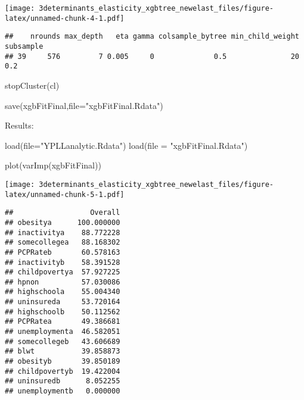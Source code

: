 \documentclass[
]{article}
\newenvironment{Shaded}{\begin{snugshade}}{\end{snugshade}}
\newcommand{\AttributeTok}[1]{\textcolor[rgb]{0.77,0.63,0.00}{#1}}
\newcommand{\FunctionTok}[1]{\textcolor[rgb]{0.00,0.00,0.00}{#1}}
\newcommand{\NormalTok}[1]{#1}
\newcommand{\OtherTok}[1]{\textcolor[rgb]{0.56,0.35,0.01}{#1}}
\newcommand{\SpecialCharTok}[1]{\textcolor[rgb]{0.00,0.00,0.00}{#1}}
\newcommand{\StringTok}[1]{\textcolor[rgb]{0.31,0.60,0.02}{#1}}
\begin{document}
\texttt{[image: 3determinants\_elasticity\_xgbtree\_newelast\_files/figure-latex/unnamed-chunk-4-1.pdf]}

\begin{Shaded}
\end{Shaded}

\begin{verbatim}
##    nrounds max_depth   eta gamma colsample_bytree min_child_weight subsample
## 39     576         7 0.005     0              0.5               20       0.2
\end{verbatim}

\begin{Shaded}
\begin{Highlighting}[]
\FunctionTok{stopCluster}\NormalTok{(cl)}

\FunctionTok{save}\NormalTok{(xgbFitFinal,}\AttributeTok{file=}\StringTok{"xgbFitFinal.Rdata"}\NormalTok{)}
\end{Highlighting}
\end{Shaded}

Results:

\begin{Shaded}
\begin{Highlighting}[]
\FunctionTok{load}\NormalTok{(}\AttributeTok{file=}\StringTok{"YPLLanalytic.Rdata"}\NormalTok{)}
\FunctionTok{load}\NormalTok{(}\AttributeTok{file =} \StringTok{"xgbFitFinal.Rdata"}\NormalTok{)}

\FunctionTok{plot}\NormalTok{(}\FunctionTok{varImp}\NormalTok{(xgbFitFinal))}
\end{Highlighting}
\end{Shaded}

\texttt{[image: 3determinants\_elasticity\_xgbtree\_newelast\_files/figure-latex/unnamed-chunk-5-1.pdf]}

\begin{Shaded}
\end{Shaded}

\begin{verbatim}
##                  Overall
## obesitya      100.000000
## inactivitya    88.772228
## somecollegea   88.168302
## PCPRateb       60.578163
## inactivityb    58.391528
## childpovertya  57.927225
## hpnon          57.030086
## highschoola    55.004340
## uninsureda     53.720164
## highschoolb    50.112562
## PCPRatea       49.386681
## unemploymenta  46.582051
## somecollegeb   43.606689
## blwt           39.858873
## obesityb       39.850189
## childpovertyb  19.422004
## uninsuredb      8.052255
## unemploymentb   0.000000
\end{verbatim}
\end{document}
